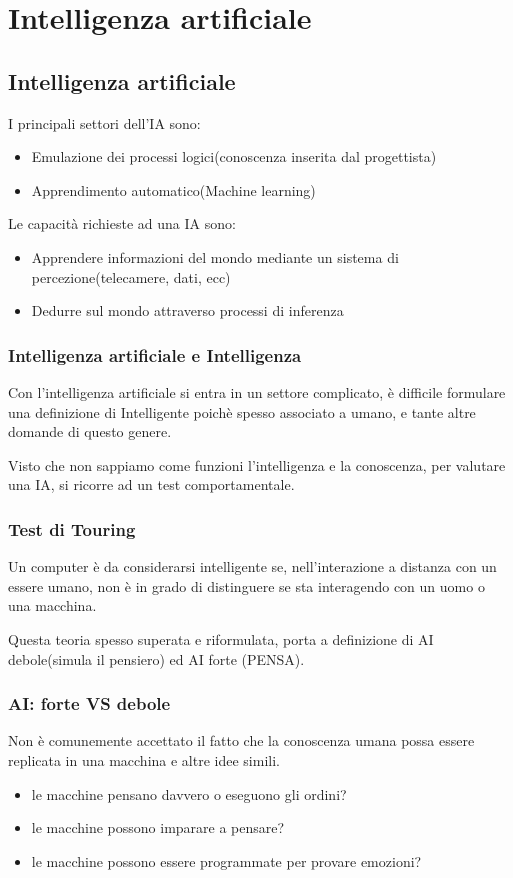 \section{Intelligenza artificiale}

\subsection{Intelligenza artificiale}
I principali settori dell'IA sono:
\begin{itemize}
    \item Emulazione dei processi logici(conoscenza inserita dal progettista)
    \item Apprendimento automatico(Machine learning)
\end{itemize}

Le capacità richieste ad una IA sono:
\begin{itemize}
    \item Apprendere informazioni del mondo mediante un sistema di percezione(telecamere, dati, ecc)
    \item Dedurre sul mondo attraverso processi di inferenza
\end{itemize}

\subsubsection{Intelligenza artificiale e Intelligenza}
Con l'intelligenza artificiale si entra in un settore complicato, è difficile formulare una definizione di
Intelligente poichè spesso associato a umano, e tante altre domande di questo genere.

Visto che non sappiamo come funzioni l'intelligenza e la conoscenza,
per valutare una IA, si ricorre ad un test comportamentale.

\subsubsection{Test di Touring}
Un computer è da considerarsi intelligente
se, nell'interazione a distanza con un
essere umano, non è in grado di
distinguere se sta interagendo con un
uomo o una macchina.

Questa teoria spesso superata e riformulata, porta a definizione di AI debole(simula il pensiero) ed AI forte
(PENSA).

\subsubsection{AI: forte VS debole}
Non è comunemente accettato il fatto che la conoscenza umana possa essere replicata in una macchina
e altre idee simili.
\begin{itemize}
    \item le macchine pensano davvero o eseguono gli ordini?
    \item le macchine possono imparare a pensare?
    \item le macchine possono essere programmate per provare emozioni?
\end{itemize}


